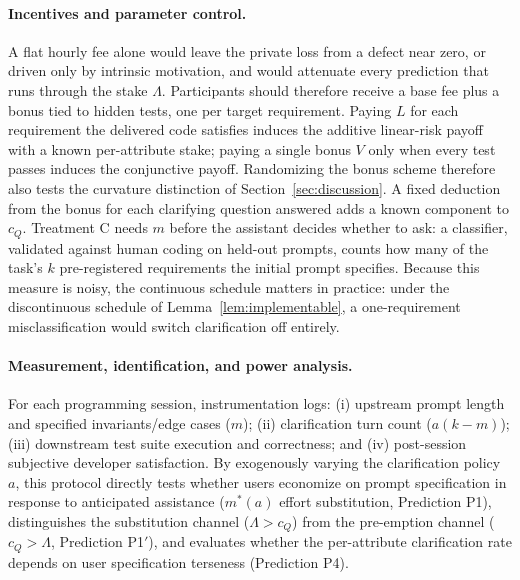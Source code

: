 \documentclass[11pt]{article}
\begin{document}
\paragraph{Incentives and parameter control.}
A flat hourly fee alone would leave the private loss from a defect near zero, or driven only by intrinsic motivation, and would attenuate every prediction that runs through the stake $\Lambda$. Participants should therefore receive a base fee plus a bonus tied to hidden tests, one per target requirement. Paying $L$ for each requirement the delivered code satisfies induces the additive linear-risk payoff with a known per-attribute stake; paying a single bonus $V$ only when every test passes induces the conjunctive payoff. Randomizing the bonus scheme therefore also tests the curvature distinction of Section~\ref{sec:discussion}. A fixed deduction from the bonus for each clarifying question answered adds a known component to $c_Q$. Treatment C needs $m$ before the assistant decides whether to ask: a classifier, validated against human coding on held-out prompts, counts how many of the task's $k$ pre-registered requirements the initial prompt specifies. Because this measure is noisy, the continuous schedule matters in practice: under the discontinuous schedule of Lemma~\ref{lem:implementable}, a one-requirement misclassification would switch clarification off entirely.

\paragraph{Measurement, identification, and power analysis.}
For each programming session, instrumentation logs: (i) upstream prompt length and specified invariants\slash edge cases ($m$); (ii) clarification turn count ($a(k-m)$); (iii) downstream test suite execution and correctness; and (iv) post-session subjective developer satisfaction.
By exogenously varying the clarification policy $a$, this protocol directly tests whether users economize on prompt specification in response to anticipated assistance ($m^*(a)$ effort substitution, Prediction P1), distinguishes the substitution channel ($\Lambda > c_Q$) from the pre-emption channel ($c_Q > \Lambda$, Prediction P1$'$), and evaluates whether the per-attribute clarification rate depends on user specification terseness (Prediction P4).
\end{document}
